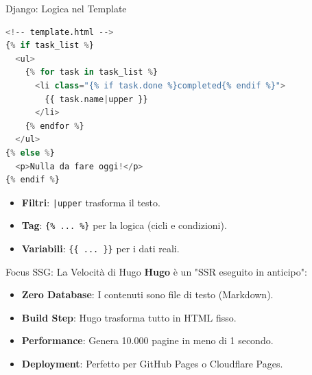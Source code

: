 \documentclass[10pt]{beamer}
\begin{document}
\begin{frame}[fragile]{Django: Logica nel Template}
    \begin{lstlisting}[language=Python]
<!-- template.html -->
{% if task_list %}
  <ul>
    {% for task in task_list %}
      <li class="{% if task.done %}completed{% endif %}">
        {{ task.name|upper }}
      </li>
    {% endfor %}
  </ul>
{% else %}
  <p>Nulla da fare oggi!</p>
{% endif %}
    \end{lstlisting}
    \begin{itemize}
        \item \textbf{Filtri}: \texttt{|upper} trasforma il testo.
        \item \textbf{Tag}: \texttt{\{\% ... \%\}} per la logica (cicli e condizioni).
        \item \textbf{Variabili}: \texttt{\{\{ ... \}\}} per i dati reali.
    \end{itemize}
\end{frame}

\begin{frame}{Focus SSG: La Velocità di Hugo}
    \textbf{Hugo} è un "SSR eseguito in anticipo":
    \begin{itemize}
        \item \textbf{Zero Database}: I contenuti sono file di testo (Markdown).
        \item \textbf{Build Step}: Hugo trasforma tutto in HTML fisso.
    \end{itemize}
    \vspace{0.3cm}
    \centering
    \vspace{0.3cm}
    \begin{itemize}
        \item \textbf{Performance}: Genera 10.000 pagine in meno di 1 secondo.
        \item \textbf{Deployment}: Perfetto per GitHub Pages o Cloudflare Pages.
    \end{itemize}
\end{frame}
\end{document}
